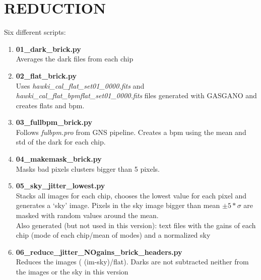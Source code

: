 \documentclass[4paper,11pt]{report}
\begin{document}
\section*{REDUCTION}
Six different  scripts:
\begin{enumerate}
	\item \textbf{01\_dark\_brick.py} \\
	Averages the dark files from each chip
	\item \textbf{02\_flat\_brick.py} \\
	Uses \textit{hawki\_cal\_flat\_set01\_0000.fits} and \textit{hawki\_cal\_flat\_bpmflat\_set01\_0000.fits} files generated with GASGANO and creates flats and bpm.
	\item \textbf{03\_fullbpm\_brick.py} \\
	Follows \textit{fulbpm.pro} from GNS pipeline. Creates a bpm using the mean and std of the dark for each chip.   
	\item \textbf{04\_makemask\_brick.py} \\
	Masks bad pixels clusters bigger than 5 pixels.
	\item \textbf{05\_sky\_jitter\_lowest.py} \\
	Stacks all images for each chip, chooses the lowest value for each pixel and generates a ‘sky’ image.
	Pixels in the sky image bigger than  mean $\pm5\ast\sigma$ are masked with random values around the mean.\\
	Also generated (but not used in this version): text files with the gains of each chip (mode of each chip/mean of modes)  and a normalized sky 
	\item \textbf{06\_reduce\_jitter\_NOgains\_brick\_headers.py} \\
	Reduces the images ( (im-sky)/flat). Darks are not subtracted neither from the images or the sky in this version \\
\end{enumerate}
\end{document}

